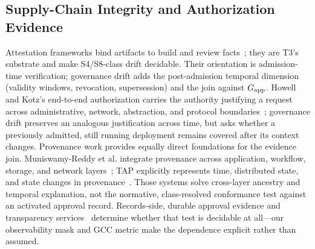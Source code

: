\subsection{Supply-Chain Integrity and Authorization Evidence}
Attestation frameworks bind artifacts to build and review
facts~\cite{slsa,torres2019,newman2022}; they are T3's substrate and make
S4/S8-class drift decidable. Their orientation is admission-time
verification; governance drift adds the post-admission temporal dimension
(validity windows, revocation, supersession) and the join against
$G_{\mathrm{app}}$. Howell and Kotz's end-to-end authorization carries the authority
justifying a request across administrative, network, abstraction, and protocol
boundaries~\cite{howell2000e2e}; governance drift preserves an analogous
justification across time, but asks whether a previously admitted, still
running deployment remains covered after its context changes. Provenance work
provides equally direct foundations for the evidence join. Muniswamy-Reddy
et al. integrate provenance across application, workflow, storage, and network
layers~\cite{muniswamyreddy2009layering}; TAP explicitly represents time,
distributed state, and state changes in provenance~\cite{zhou2011tap}.
Those systems solve cross-layer ancestry and temporal explanation, not the
normative, class-resolved conformance test against an activated approval
record. Records-side, durable approval evidence and transparency
services~\cite{scitt2025,provdm,cloudtrail} determine whether that test is
decidable at all---our observability mask and GCC metric make the dependence
explicit rather than assumed.

